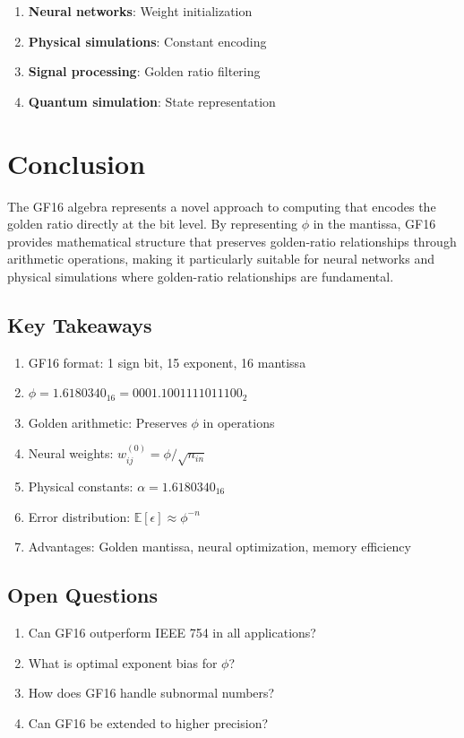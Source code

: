 \begin{enumerate}
\item \textbf{Neural networks}: Weight initialization
\item \textbf{Physical simulations}: Constant encoding
\item \textbf{Signal processing}: Golden ratio filtering
\item \textbf{Quantum simulation}: State representation
\end{enumerate}

\section{Conclusion}

The GF16 algebra represents a novel approach to computing that encodes the golden ratio directly at the bit level. By representing $\phi$ in the mantissa, GF16 provides mathematical structure that preserves golden-ratio relationships through arithmetic operations, making it particularly suitable for neural networks and physical simulations where golden-ratio relationships are fundamental.

\subsection*{Key Takeaways}

\begin{enumerate}
\item GF16 format: 1 sign bit, 15 exponent, 16 mantissa
\item $\phi = 1.6180340_16 = 0001.1001111011100_2$
\item Golden arithmetic: Preserves $\phi$ in operations
\item Neural weights: $w_{ij}^{(0)} = \phi/\sqrt{n_{in}}$
\item Physical constants: $\alpha = 1.6180340_16$
\item Error distribution: $\mathbb{E}[\epsilon] \approx \phi^{-n}$
\item Advantages: Golden mantissa, neural optimization, memory efficiency
\end{enumerate}

\subsection*{Open Questions}

\begin{enumerate}
\item Can GF16 outperform IEEE 754 in all applications?
\item What is optimal exponent bias for $\phi$?
\item How does GF16 handle subnormal numbers?
\item Can GF16 be extended to higher precision?
\end{enumerate}

